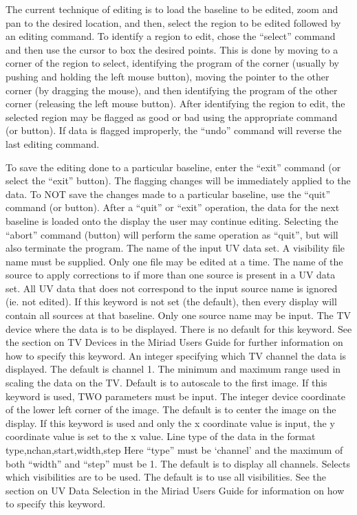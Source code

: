 {The current technique of editing is to load the baseline
to be edited, zoom and pan to the desired location, and
then, select the region to be edited followed by an
editing command.  To identify a region to edit, chose
the ``select'' command and then use the cursor to box
the desired points.  This is done by moving to a corner
of the region to select, identifying the program of the
corner (usually by pushing and holding the left mouse
button), moving the pointer to the other corner (by
dragging the mouse), and then identifying the program of
the other corner (releasing the left mouse button).  After
identifying the region to edit, the selected region may be
flagged as good or bad using the appropriate command (or
button).  If data is flagged improperly, the ``undo''
command will reverse the last editing command.

To save the editing done to a particular baseline, enter
the ``exit'' command (or select the ``exit'' button).
The flagging changes will be immediately applied to the
data.  To NOT save the changes made to a particular
baseline, use the ``quit'' command (or button).  After
a ``quit'' or ``exit'' operation, the data for the next
baseline is loaded onto the display the user may continue
editing.  Selecting the ``abort'' command (button) will
perform the same operation as ``quit'', but will also
terminate the program.
The name of the input UV data set.  A visibility file name
must be supplied.  Only one file may be edited at a time.
The name of the source to apply corrections to if more than
one source is present in a UV data set.  All UV data that
does not correspond to the input source name is ignored
(ie. not edited).  If this keyword is not set (the default),
then every display will contain all sources at that
baseline.  Only one source name may be input.
The TV device where the data is to be displayed.  There
is no default for this keyword.  See the section on TV
Devices in the Miriad Users Guide for further information
on how to specify this keyword.
An integer specifying which TV channel the data is
displayed.  The default is channel 1.
The minimum and maximum range used in scaling the data
on the TV.  Default is to autoscale to the first image.
If this keyword is used, TWO parameters must be input.
The integer device coordinate of the lower left corner
of the image.  The default is to center the image on the
display.  If this keyword is used and only the x coordinate
value is input, the y coordinate value is set to the x value.
Line type of the data in the format
{\eightpoint\begintt
    type,nchan,start,width,step
\endtt}
Here ``type'' must be `channel' and the maximum of
both ``width'' and ``step'' must be 1.  The default is
to display all channels.
Selects which visibilities are to be used.  The default is
to use all visibilities.  See the section on UV Data
Selection in the Miriad Users Guide for information on how
to specify this keyword.
\par}
